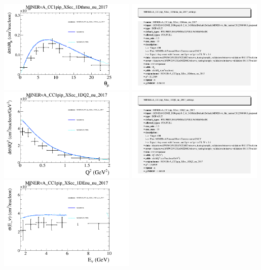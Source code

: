 \documentclass{article}
\begin{document}
\centering
\includegraphics[width=0.49\textwidth]{figures/nuisance_MINERvA_CC1pip_XSec_1Dthmu_nu_2017_comp.png}
\includegraphics[width=0.49\textwidth]{figures/nuisance_MINERvA_CC1pip_XSec_1Dthmu_nu_2017_info.png}
\centering
\includegraphics[width=0.49\textwidth]{figures/nuisance_MINERvA_CC1pip_XSec_1DQ2_nu_2017_comp.png}
\includegraphics[width=0.49\textwidth]{figures/nuisance_MINERvA_CC1pip_XSec_1DQ2_nu_2017_info.png}
\centering
\includegraphics[width=0.49\textwidth]{figures/nuisance_MINERvA_CC1pip_XSec_1DEnu_nu_2017_comp.png}
\end{document}
